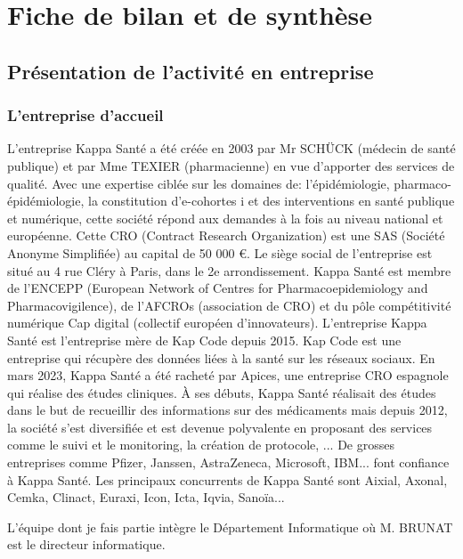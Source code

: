 \section{Fiche de bilan et de synthèse}
\subsection{Présentation de l'activité en entreprise}
\subsubsection{L'entreprise d'accueil}
L’entreprise Kappa Santé a été créée en 2003 par Mr SCHÜCK (médecin de
santé publique) et par Mme TEXIER (pharmacienne) en vue d’apporter des
services de qualité. Avec une expertise ciblée sur les domaines de:
l’épidémiologie, pharmaco- épidémiologie, la constitution d’e-cohortes i et des
interventions en santé publique et numérique, cette société répond aux
demandes à la fois au niveau national et européenne.
Cette CRO (Contract Research Organization) est une SAS (Société Anonyme
Simplifiée) au capital de 50 000 €.
Le siège social de l’entreprise est situé au 4 rue Cléry à Paris, dans le 2e
arrondissement.
Kappa Santé est membre de l’ENCEPP (European Network of Centres for
Pharmacoepidemiology and Pharmacovigilence), de l’AFCROs (association de
CRO) et du pôle compétitivité numérique Cap digital (collectif européen
d’innovateurs).
L’entreprise Kappa Santé est l’entreprise mère de Kap Code depuis 2015. Kap
Code est une entreprise qui récupère des données liées à la santé sur les
réseaux sociaux.
En mars 2023, Kappa Santé a été racheté par Apices, une entreprise CRO
espagnole qui réalise des études cliniques.
À ses débuts, Kappa Santé réalisait des études dans le but de recueillir des
informations sur des médicaments mais depuis 2012, la société s’est diversifiée
et est devenue polyvalente en proposant des services comme le suivi et le
monitoring, la création de protocole, ...
De grosses entreprises comme Pfizer, Janssen, AstraZeneca, Microsoft, IBM... font confiance à Kappa Santé. Les principaux concurrents de Kappa Santé sont
Aixial, Axonal, Cemka, Clinact, Euraxi, Icon, Icta, Iqvia, Sanoïa...

L’équipe dont je fais partie intègre le Département Informatique où M. BRUNAT est le directeur informatique.

